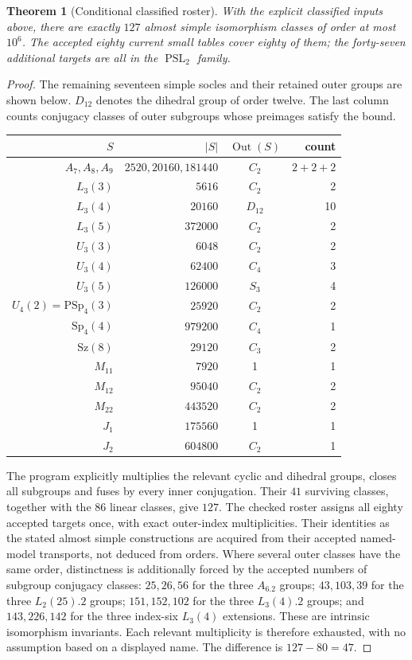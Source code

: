 \documentclass[11pt]{article}
\newtheorem{theorem}{Theorem}\newtheorem{lemma}{Lemma}
\newcommand{\PSL}{\operatorname{PSL}}\newcommand{\Aut}{\operatorname{Aut}}
\newcommand{\Out}{\operatorname{Out}}
\begin{document}
\begin{theorem}[Conditional classified roster]
With the explicit classified inputs above, there are exactly $127$
almost simple isomorphism classes of order at most $10^6$. The accepted
eighty current small tables cover eighty of them; the forty-seven
additional targets are all in the $\PSL_2$ family.
\end{theorem}
\begin{proof}
The remaining seventeen simple socles and their retained outer groups
are shown below. $D_{12}$ denotes the dihedral group of order twelve.
The last column counts conjugacy classes of outer subgroups whose
preimages satisfy the bound.
\begin{center}\begin{tabular}{r r c r}
$S$&$|S|$&$\Out(S)$&count\\\hline
$A_7,A_8,A_9$&$2520,20160,181440$&$C_2$&$2+2+2$\\
$L_3(3)$&$5616$&$C_2$&2\\
$L_3(4)$&$20160$&$D_{12}$&10\\
$L_3(5)$&$372000$&$C_2$&2\\
$U_3(3)$&$6048$&$C_2$&2\\
$U_3(4)$&$62400$&$C_4$&3\\
$U_3(5)$&$126000$&$S_3$&4\\
$U_4(2)=\mathrm{PSp}_4(3)$&$25920$&$C_2$&2\\
$\mathrm{Sp}_4(4)$&$979200$&$C_4$&1\\
$\mathrm{Sz}(8)$&$29120$&$C_3$&2\\
$M_{11}$&$7920$&1&1\\
$M_{12}$&$95040$&$C_2$&2\\
$M_{22}$&$443520$&$C_2$&2\\
$J_1$&$175560$&1&1\\
$J_2$&$604800$&$C_2$&1
\end{tabular}\end{center}
The program explicitly multiplies the relevant cyclic and dihedral
groups, closes all subgroups and fuses by every inner conjugation.
Their $41$ surviving classes, together with the $86$ linear classes,
give $127$. The checked roster assigns all eighty accepted targets
once, with exact outer-index multiplicities. Their identities as
the stated almost simple constructions are acquired from their accepted
named-model transports, not deduced from orders. Where several outer
classes have the same order, distinctness is additionally forced by
the accepted numbers of subgroup conjugacy classes:
$25,26,56$ for the three $A_6.2$ groups;
$43,103,39$ for the three $L_2(25).2$ groups;
$151,152,102$ for the three $L_3(4).2$ groups; and
$143,226,142$ for the three index-six $L_3(4)$ extensions.
These are intrinsic isomorphism invariants. Each relevant multiplicity
is therefore exhausted, with no assumption based on a displayed name.
The difference is $127-80=47$.
\end{proof}
\end{document}
